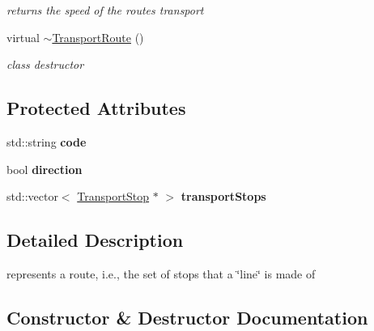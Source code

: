 \begin{DoxyCompactItemize}
\begin{DoxyCompactList}\small\item\em returns the speed of the route\textquotesingle{}s transport \end{DoxyCompactList}\item 
\hypertarget{class_transport_route_a824d48902634ab05f08c348583584466}{}virtual \hyperlink{class_transport_route_a824d48902634ab05f08c348583584466}{$\sim$\+Transport\+Route} ()\label{class_transport_route_a824d48902634ab05f08c348583584466}

\begin{DoxyCompactList}\small\item\em class destructor \end{DoxyCompactList}\end{DoxyCompactItemize}
\subsection*{Protected Attributes}
\begin{DoxyCompactItemize}
\item 
\hypertarget{class_transport_route_a6184b1d4457a4a986619b9ab0c720461}{}std\+::string {\bfseries code}\label{class_transport_route_a6184b1d4457a4a986619b9ab0c720461}

\item 
\hypertarget{class_transport_route_a3b429737a6897a21ef4ef328e9a517db}{}bool {\bfseries direction}\label{class_transport_route_a3b429737a6897a21ef4ef328e9a517db}

\item 
\hypertarget{class_transport_route_a6d5816ad9c6821cd5bea3a5cf8ca7cd6}{}std\+::vector$<$ \hyperlink{class_transport_stop}{Transport\+Stop} $\ast$ $>$ {\bfseries transport\+Stops}\label{class_transport_route_a6d5816ad9c6821cd5bea3a5cf8ca7cd6}

\end{DoxyCompactItemize}


\subsection{Detailed Description}
represents a route, i.\+e., the set of stops that a \char`\"{}line\char`\"{} is made of 

\subsection{Constructor \& Destructor Documentation}
\hypertarget{class_transport_route_a5eaa150e32517b46d0b642bdfdf28647}{}
